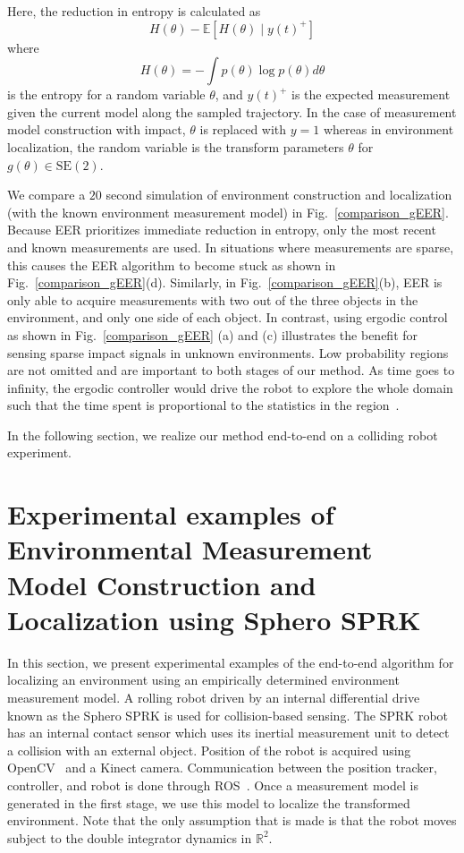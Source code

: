 \documentclass[conference]{IEEEtran}
\begin{document}
Here, the reduction in entropy is calculated as
\begin{equation*}
H(\theta) - \mathbb{E}\left[ H(\theta) \mid y(t)^+\right]
\end{equation*} 
where
\begin{equation*}
H(\theta) = - \int p(\theta) \log p(\theta) d \theta
\end{equation*}
is the entropy for a random variable $\theta$, and $y(t)^+$ is the expected measurement given the current model along the sampled trajectory.
In the case of measurement model construction with impact, $\theta$ is replaced with $y=1$ whereas in environment localization, the random variable is the transform parameters $\theta$ for $g(\theta)\in \text{SE}(2)$.

We compare a $20$ second simulation of environment construction and localization (with the known environment measurement model) in Fig.~\ref{comparison_gEER}.
Because EER prioritizes immediate reduction in entropy, only the most recent and known measurements are used.
In situations where measurements are sparse, this causes the EER algorithm to become stuck as shown in Fig.~\ref{comparison_gEER}(d). 
Similarly, in Fig.~\ref{comparison_gEER}(b), EER is only able to acquire measurements with two out of the three objects in the environment, and only one side of each object.
In contrast, using ergodic control as shown in Fig.~\ref{comparison_gEER} (a) and (c) illustrates the benefit for sensing sparse impact signals in unknown environments.
Low probability regions are not omitted and are important to both stages of our method. 
As time goes to infinity, the ergodic controller would drive the robot to explore the whole domain such that the time spent is proportional to the statistics in the region~\cite{miller2016ergodic, miller2015optimalrange, mavrommati2017eSAC, abrahamRAL17}.

In the following section, we realize our method end-to-end on a colliding robot experiment.

\section{Experimental examples of Environmental Measurement Model Construction and Localization using Sphero SPRK}
\label{sec:exp_ex}

In this section, we present experimental examples of the end-to-end algorithm for localizing an environment using an empirically determined environment measurement model.
A rolling robot driven by an internal differential drive known as the Sphero SPRK is used for collision-based sensing.
The SPRK robot has an internal contact sensor which uses its inertial measurement unit to detect a collision with an external object.
Position of the robot is acquired using OpenCV~\cite{opencv_library} and a Kinect camera.
Communication between the position tracker, controller, and robot is done through ROS~\cite{ROS}.
Once a measurement model is generated in the first stage, we use this model to localize the transformed environment.
Note that the only assumption that is made is that the robot moves subject to the double integrator dynamics in $\mathbb{R}^2$.
 
\end{document}
